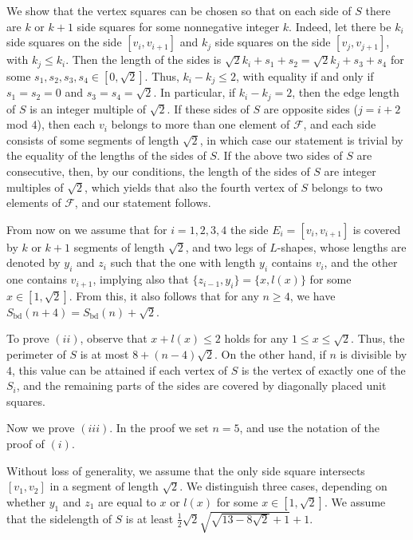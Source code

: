 \documentclass[twoside]{amsart}
\DeclareMathOperator{\bd}{bd}
\begin{document}
We show that the vertex squares can be chosen so that on each side of $S$ there are $k$ or $k+1$ side squares for some nonnegative integer $k$. Indeed, let there be $k_i$ side squares on the side 
$[v_i,v_{i+1}]$ and $k_j$ side squares on the side 
$[v_j,v_{j+1}]$,
with $k_j \leq k_i$. Then the length of the sides is $\sqrt{2} k_i+s_1+s_2=\sqrt{2} k_j+s_3+s_4$ for some $s_1,s_2,s_3,s_4 \in [0,\sqrt{2}]$. Thus, $k_i-k_j \leq 2$, with equality if and only if $s_1=s_2=0$ and $s_3=s_4=\sqrt{2}$. In particular, if $k_i-k_j=2$, then the edge length of $S$ is an integer multiple of $\sqrt{2}$. If these sides of $S$ are opposite sides ($j=i+2$ mod $4$), then each $v_i$ belongs to more than one element of $\mathcal{F}$, and each side consists of some segments of length $\sqrt{2}$, in which case our statement is trivial by the equality of the lengths of the sides of $S$. If the above two sides of $S$ are consecutive, then, by our conditions, the length of the sides of $S$ are integer multiples of $\sqrt{2}$, which yields that also the fourth vertex of $S$ belongs to two elements of $\mathcal{F}$, and our statement follows.

From now on we assume that for 
$i=1,2,3,4$ the side $E_i=[v_i,v_{i+1}]$ is covered by $k$ or $k+1$ segments of length $\sqrt{2}$, and two legs of $L$-shapes, whose lengths are denoted by $y_i$ and $z_i$ such that the one with length $y_i$ contains $v_i$, and the other one contains $v_{i+1}$, implying also that $\{ z_{i-1}, y_i \} = \{ x, l(x) \}$ for some $x \in [1,\sqrt{2}]$. From this, it also follows that for any $n \geq 4$, we have $S_{\bd}(n+4) = S_{\bd}(n)+\sqrt{2}$.

To prove $(ii)$, observe that $x+l(x) \leq 2$ holds for any $1 \leq x \leq \sqrt{2}$. Thus, the perimeter of $S$ is at most $8+(n-4)\sqrt{2}$. On the other hand, if $n$ is divisible by $4$, this value can be attained if each vertex of $S$ is the vertex of exactly one of the $S_i$, and the remaining parts of the sides are covered by diagonally placed unit squares.

Now we prove $(iii)$. In the proof we set $n=5$, and use the notation of the proof of $(i)$.

Without loss of generality, we assume that the only side square intersects $[v_1,v_2]$ in a segment of length $\sqrt{2}$. We distinguish three cases, depending on whether $y_1$ and $z_1$ are equal to $x$ or $l(x)$ for some $x \in [1,\sqrt{2}]$. We assume that the sidelength of $S$ is at least $\frac{1}{2}\sqrt{2}\sqrt{\sqrt{13-8\sqrt{2}}+1} + 1$.
\end{document}
